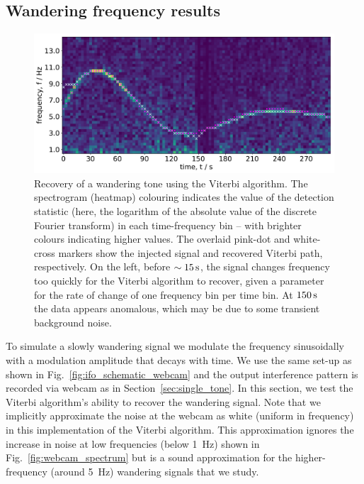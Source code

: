 \documentclass[paper-main.tex]{subfiles}
\begin{document}
\subsection{Wandering frequency results}
\label{sec:wanderingResults}

\begin{figure}
	\includegraphics[width=\textwidth]{figures/expt_overlay_2_viterbi_test_webcam.pdf}
	\caption{\label{fig:viterbi_overlay}
Recovery of a wandering tone using the Viterbi algorithm.
The spectrogram (heatmap) colouring indicates the value of the detection statistic (here, the logarithm of the absolute value of the discrete Fourier transform) in each time-frequency bin -- with brighter colours indicating higher values. 
The overlaid pink-dot and white-cross markers show the injected signal and recovered Viterbi path, respectively. 
On the left, before $\sim 15\,{\rm s}$, the signal changes frequency too quickly for the Viterbi algorithm to recover, given a parameter for the rate of change of one frequency bin per time bin. 
At $150\,{\rm s}$ the data appears anomalous, which may be due to some transient background noise. }
\end{figure}
 

To simulate a slowly wandering signal we modulate the frequency sinusoidally with a modulation amplitude that decays with time. 
We use the same set-up as shown in Fig.~\ref{fig:ifo_schematic_webcam} and the output interference pattern is recorded via webcam as in Section~\ref{sec:single_tone}. 
In this section, we test the Viterbi algorithm’s ability to recover the wandering signal. 
Note that we implicitly approximate the noise at the webcam as white (uniform in frequency) in this implementation of the Viterbi algorithm. This approximation ignores the increase in noise at low frequencies (below 1~Hz) shown in Fig.~\ref{fig:webcam_spectrum} but is a sound approximation for the higher-frequency (around 5~Hz) wandering signals that we study.
\end{document}
